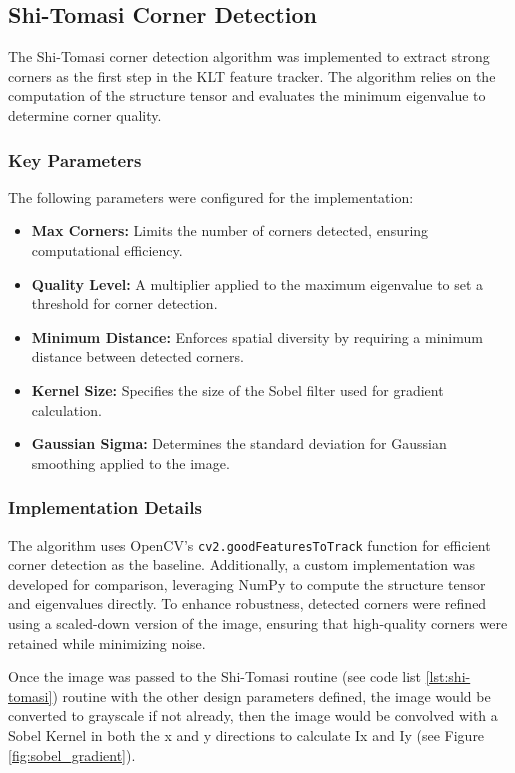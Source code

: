 \documentclass[11pt, conference, letterpaper]{IEEEtran}
\begin{document}
\subsection{Shi-Tomasi Corner Detection}
The Shi-Tomasi corner detection algorithm was implemented to extract strong corners as the first step in the KLT feature tracker. The algorithm relies on the computation of the structure tensor and evaluates the minimum eigenvalue to determine corner quality.

\subsubsection{Key Parameters}
The following parameters were configured for the implementation:
\begin{itemize}
    \item \textbf{Max Corners:} Limits the number of corners detected, ensuring computational efficiency.
    \item \textbf{Quality Level:} A multiplier applied to the maximum eigenvalue to set a threshold for corner detection.
    \item \textbf{Minimum Distance:} Enforces spatial diversity by requiring a minimum distance between detected corners.
    \item \textbf{Kernel Size:} Specifies the size of the Sobel filter used for gradient calculation.
    \item \textbf{Gaussian Sigma:} Determines the standard deviation for Gaussian smoothing applied to the image.
\end{itemize}
\bigskip

\subsubsection{Implementation Details}
The algorithm uses OpenCV's \texttt{cv2.goodFeaturesToTrack} function for efficient corner detection as the baseline. Additionally, a custom implementation was developed for comparison, leveraging NumPy to compute the structure tensor and eigenvalues directly.
To enhance robustness, detected corners were refined using a scaled-down version of the image, ensuring that high-quality corners were retained while minimizing noise. 

Once the image was passed to the Shi-Tomasi routine (see code list \ref{lst:shi-tomasi}) routine with the other design parameters defined, the image would be converted to grayscale if not already, then the image would be convolved with a Sobel Kernel in both the x and y directions to calculate Ix and Iy (see Figure \ref{fig:sobel_gradient}). 
\end{document}
